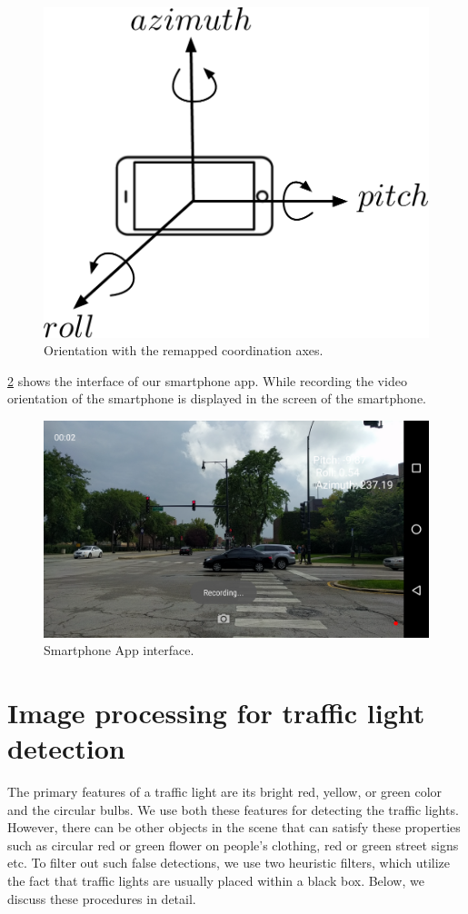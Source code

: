 \begin{figure}[ht]
\centering
\includegraphics[width=4.5in]{figures/remap.pdf}
\caption{Orientation with the remapped coordination axes.}
\label{f:remap}
\end{figure}
\ref{f:app} shows the interface of our smartphone app.
While recording the video orientation of the smartphone is displayed in the screen of the smartphone.

\begin{figure}[!ht]
\centering
\includegraphics[width=5.2in]{images/app_interface.png}
\caption{Smartphone App interface.}
\label{f:app}
\end{figure}

\section{Image processing for traffic light detection}
The primary features of a traffic light are its bright red, yellow, or green color and the circular bulbs.
We use both these features for detecting the traffic lights. 
However, there can be other objects in the scene that can satisfy these properties such as circular red or green flower on people's clothing, red or green street signs etc.
To filter out such false detections, we use two heuristic filters, which utilize the fact that traffic lights are usually placed within a black box. 
Below, we discuss these procedures in detail.

